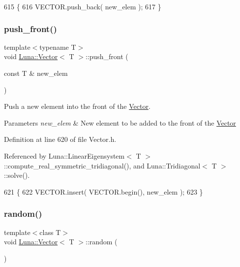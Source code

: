 \begin{DoxyCode}
615   \{
616     VECTOR.push\_back( new\_elem );
617   \}
\end{DoxyCode}
\mbox{\label{classLuna_1_1Vector_a5361abffa2009f603103aed197743554}} 
\subsubsection{\texorpdfstring{push\+\_\+front()}{push\_front()}}
{\footnotesize\ttfamily template$<$typename T$>$ \\
void \hyperlink{classLuna_1_1Vector}{Luna\+::\+Vector}$<$ T $>$\+::push\+\_\+front (\begin{DoxyParamCaption}\item[{const T \&}]{new\+\_\+elem }\end{DoxyParamCaption})\hspace{0.3cm}{\ttfamily [inline]}}



Push a new element into the front of the \hyperlink{classLuna_1_1Vector}{Vector}. 


\begin{DoxyParams}{Parameters}
{\em new\+\_\+elem} & New element to be added to the front of the \hyperlink{classLuna_1_1Vector}{Vector} \\
\hline
\end{DoxyParams}


Definition at line 620 of file Vector.\+h.



Referenced by Luna\+::\+Linear\+Eigensystem$<$ T $>$\+::compute\+\_\+real\+\_\+symmetric\+\_\+tridiagonal(), and Luna\+::\+Tridiagonal$<$ T $>$\+::solve().


\begin{DoxyCode}
621   \{
622     VECTOR.insert( VECTOR.begin(), new\_elem );
623   \}
\end{DoxyCode}
\mbox{\label{classLuna_1_1Vector_af5d145bb808403eca4a2ea4edd1132c2}} 
\subsubsection{\texorpdfstring{random()}{random()}\hspace{0.1cm}{\footnotesize\ttfamily [1/3]}}
{\footnotesize\ttfamily template$<$class T$>$ \\
void \hyperlink{classLuna_1_1Vector}{Luna\+::\+Vector}$<$ T $>$\+::random (\begin{DoxyParamCaption}{ }\end{DoxyParamCaption})}



